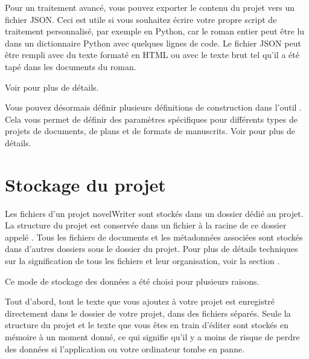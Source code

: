 \documentclass[a4paper,11pt,french]{sphinxmanual}
\begin{document}
\sphinxAtStartPar
Pour un traitement avancé, vous pouvez exporter le contenu du projet vers un fichier JSON. Ceci est utile si vous souhaitez écrire votre propre script de traitement personnalisé, par exemple en Python, car le roman entier peut être lu dans un dictionnaire Python avec quelques lignes de code. Le fichier JSON peut être rempli avec du texte formaté en HTML ou avec le texte brut tel qu’il a été tapé dans les documents du roman.

\sphinxAtStartPar
Voir {\hyperref[\detokenize{project_manuscript:a-manuscript}]{}} pour plus de détails.

\sphinxAtStartPar
{}Vous pouvez désormais définir plusieurs définitions de construction dans l’outil . Cela vous permet de définir des paramètres spécifiques pour différents types de projets de documents, de plans et de formats de manuscrits. Voir {\hyperref[\detokenize{project_manuscript:a-manuscript}]{}} pour plus de détails.


\section{Stockage du projet}
\label{\detokenize{usage_breakdown:project-storage}}\label{\detokenize{usage_breakdown:a-breakdown-storage}}
\sphinxAtStartPar
Les fichiers d’un projet novelWriter sont stockés dans un dossier dédié au projet. La structure du projet est conservée dans un fichier à la racine de ce dossier appelé . Tous les fichiers de documents et les métadonnées associées sont stockés dans d’autres dossiers sous le dossier du projet. Pour plus de détails techniques sur la signification de tous les fichiers et leur organisation, voir la section {\hyperref[\detokenize{tech_storage:a-storage}]{}}.

\sphinxAtStartPar
Ce mode de stockage des données a été choisi pour plusieurs raisons.

\sphinxAtStartPar
Tout d’abord, tout le texte que vous ajoutez à votre projet est enregistré directement dans le dossier de votre projet, dans des fichiers séparés. Seule la structure du projet et le texte que vous êtes en train d’éditer sont stockés en mémoire à un moment donné, ce qui signifie qu’il y a moins de risque de perdre des données si l’application ou votre ordinateur tombe en panne.
\end{document}
